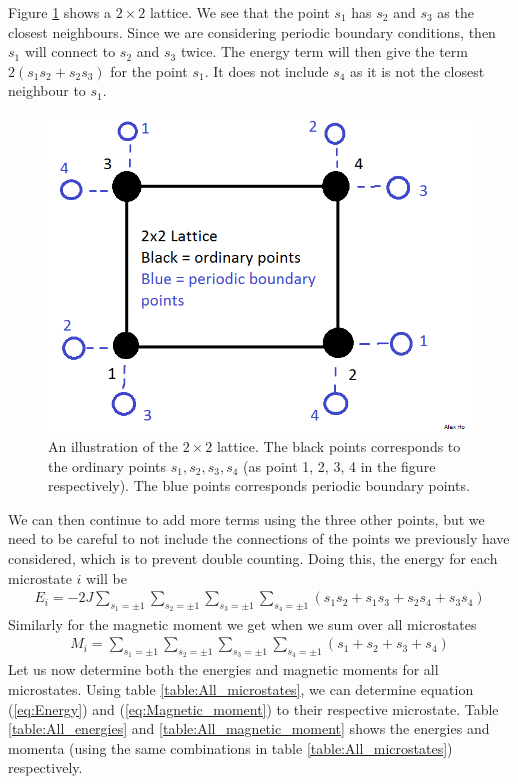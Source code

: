 \documentclass[12pt]{article}
\begin{document}
Figure \ref{fig:Lattice_illustration} shows a $2\times2$ lattice. We see that the point $s_1$ has $s_2$ and $s_3$ as the closest neighbours. Since we are considering periodic boundary conditions, then $s_1$ will connect to $s_2$ and $s_3$ twice. The energy term will then give the term $2(s_1s_2 + s_2s_3)$ for the point $s_1$. It does not include $s_4$ as it is not the closest neighbour to $s_1$. 
\begin{figure}[!h]
\centering
\includegraphics[width=\linewidth]{2x2_lattice_illustration.png}
\caption{An illustration of the $2\times 2$ lattice. The black points corresponds to the ordinary points $s_1, s_2, s_3, s_4$ (as point 1, 2, 3, 4 in the figure respectively). The blue points corresponds periodic boundary points.}
\label{fig:Lattice_illustration}
\end{figure}

We can then continue to add more terms using the three other points, but we need to be careful to not include the connections of the points we previously have considered, which is to prevent double counting. Doing this, the energy for each microstate $i$ will be
\begin{align}
E_i = -2J\displaystyle \sum_{s_1 = \pm1} \sum_{s_2 = \pm1} \sum_{s_3 = \pm1} \sum_{s_4 = \pm1}(s_1s_2 + s_1s_3 + s_2s_4 + s_3s_4)
\label{eq:Energy}
\end{align}
Similarly for the magnetic moment we get when we sum over all microstates 
\begin{align}
M_i = \displaystyle \sum_{s_1 = \pm1} \sum_{s_2 = \pm1} \sum_{s_3 = \pm1} \sum_{s_4 = \pm1} (s_1 + s_2 + s_3 + s_4)
\label{eq:Magnetic_moment}
\end{align}
Let us now determine both the energies and magnetic moments for all microstates. Using table \ref{table:All_microstates}, we can determine equation (\ref{eq:Energy}) and (\ref{eq:Magnetic_moment}) to their respective microstate. Table \ref{table:All_energies} and \ref{table:All_magnetic_moment} shows the energies and momenta (using the same combinations in table \ref{table:All_microstates}) respectively.
\end{document}
